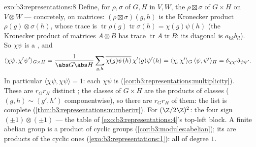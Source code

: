 \begin{solution}{exo:b3:representations:8}
Define, for  $\rho, \sigma$ of $G, H$ in $V, W$,
the  $\rho \boxtimes \sigma$ of $G \times H$ on
$V \otimes W$ --- concretely, on matrices: $(\rho\boxtimes
\sigma)(g,h)$ is the Kronecker product $\rho(g)\otimes
\sigma(h)$, whose trace is
$\operatorname{tr}\rho(g)\operatorname{tr}\sigma(h) =
\chi(g)\psi(h)$ (the Kronecker product of matrices $A \otimes B$
has trace $\operatorname{tr}A\operatorname{tr}B$: its diagonal
is $a_{kk}b_{ll}$). So $\chi\psi$ is a , and
\[
\langle\chi\psi, \chi'\psi'\rangle_{G\times H}
= \frac{1}{\abs G\abs H}\sum_{g,h}
\overline{\chi(g)\psi(h)}\,\chi'(g)\psi'(h)
= \langle\chi,\chi'\rangle_G\,\langle\psi,\psi'\rangle_H
= \delta_{\chi\chi'}\delta_{\psi\psi'}.
\]
In particular $\langle\chi\psi,\chi\psi\rangle = 1$: each
$\chi\psi$ is 
(\cref{cor:b3:representations:multiplicity}). These are
$r_Gr_H$ distinct  ; the classes of
$G\times H$ are the products of classes ($(g,h) \sim (g',h')$
componentwise), so there are $r_Gr_H$ of them: the list is
complete (\cref{thm:b3:representations:numberirr}). For
$(\Z/2\Z)^2$: the four sign 
$(\pm1)\otimes(\pm1)$ --- the table of
\cref{exo:b3:representations:4}'s top-left block. A finite
abelian group is a product of cyclic groups
(\cref{cor:b3:modules:abelian}); its   are
products of the cyclic ones (\cref{exo:b3:representations:1}):
all of degree $1$.
\end{solution}

